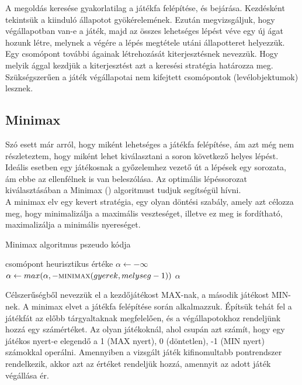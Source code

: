 A megoldás keresése gyakorlatilag a játékfa felépítése, és bejárása. Kezdésként tekintsük a kiinduló állapotot gyökérelemének. Ezután  megvizsgáljuk, hogy végállapotban van-e a játék, majd az összes lehetséges lépést véve egy új ágat hozunk létre, melynek a végére a lépés megtétele utáni állapotteret helyezzük. Egy csomópont további ágainak létrehozását kiterjesztésnek nevezzük. Hogy melyik ággal kezdjük a kiterjesztést azt a keresési stratégia határozza meg. Szükségszerűen a játék végállapotai nem kifejtett csomópontok (levélobjektumok) lesznek.\\

\subsection{Minimax}
Szó esett már arról, hogy miként lehetséges a játékfa felépítése, ám azt még nem részleteztem, hogy miként lehet kiválasztani a soron következő helyes lépést. Ideális esetben egy játékosnak a győzelemhez vezető út a lépések egy sorozata, ám ebbe az ellenfélnek is van beleszólása. Az optimális lépéssorozat kiválasztásában a Minimax () algoritmust tudjuk segítségül hívni.\\

A minimax elv egy kevert stratégia, egy olyan döntési szabály, amely azt célozza meg, hogy minimalizálja a maximális veszteséget, illetve ez meg is fordítható, maximalizálja a minimális nyereséget. \\

\begin{algorithm}
	\caption{Minimax algoritmus pszeudo kódja}
	\label{alg:minimax}
\begin{algorithmic}[1]
		\State \Return csomópont heurisztikus értéke
	\Else
		\State $\alpha \gets -\infty$
			\State $\alpha \gets max(\alpha, -\Call{minimax}{gyerek, melyseg - 1})$
			\State \Return $\alpha$
		\EndFor
	\EndIf
	\EndFunction
\end{algorithmic}
\end{algorithm}

Célszerűségből nevezzük el a kezdőjátékost MAX-nak, a második játékost MIN-nek. A minimax elvet a játékfa felépítése során alkalmazzuk. Építsük tehát fel a játékfát az előbb tárgyaltaknak megfelelően, és a végállapotokhoz rendeljünk hozzá egy számértéket. Az olyan játékoknál, ahol csupán azt számít, hogy egy játékos nyert-e elegendő a 1 (MAX nyert), 0 (döntetlen), -1 (MIN nyert) számokkal operálni. Amennyiben a vizsgált játék kifinomultabb pontrendszer rendelkezik, akkor azt az értéket rendeljük hozzá, amennyit az adott játék végállása ér.\\


